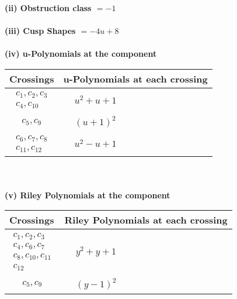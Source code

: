 \documentclass[1p]{elsarticle_modified}
\theoremstyle{definition}
\begin{document}
\flushleft \textbf{(ii) Obstruction class $= -1$}\\~\\
\flushleft \textbf{(iii) Cusp Shapes $= -4 u+8$}\\~\\
\newpage\renewcommand{\arraystretch}{1}
\flushleft \textbf{(iv) u-Polynomials at the component}\newline \\
\begin{tabular}{m{50pt}|m{274pt}}
Crossings & \hspace{64pt}u-Polynomials at each crossing \\
\hline $$\begin{aligned}c_{1},c_{2},c_{3}\\c_{4},c_{10}\end{aligned}$$&$\begin{aligned}
&u^2+u+1
\end{aligned}$\\
\hline $$\begin{aligned}c_{5},c_{9}\end{aligned}$$&$\begin{aligned}
&(u+1)^2
\end{aligned}$\\
\hline $$\begin{aligned}c_{6},c_{7},c_{8}\\c_{11},c_{12}\end{aligned}$$&$\begin{aligned}
&u^2- u+1
\end{aligned}$\\
\hline
\end{tabular}\\~\\
\newpage\renewcommand{\arraystretch}{1}
\flushleft \textbf{(v) Riley Polynomials at the component}\newline \\
\begin{tabular}{m{50pt}|m{274pt}}
Crossings & \hspace{64pt}Riley Polynomials at each crossing \\
\hline $$\begin{aligned}c_{1},c_{2},c_{3}\\c_{4},c_{6},c_{7}\\c_{8},c_{10},c_{11}\\c_{12}\end{aligned}$$&$\begin{aligned}
&y^2+y+1
\end{aligned}$\\
\hline $$\begin{aligned}c_{5},c_{9}\end{aligned}$$&$\begin{aligned}
&(y-1)^2
\end{aligned}$\\
\hline
\end{tabular}\\~\\
\end{document}
